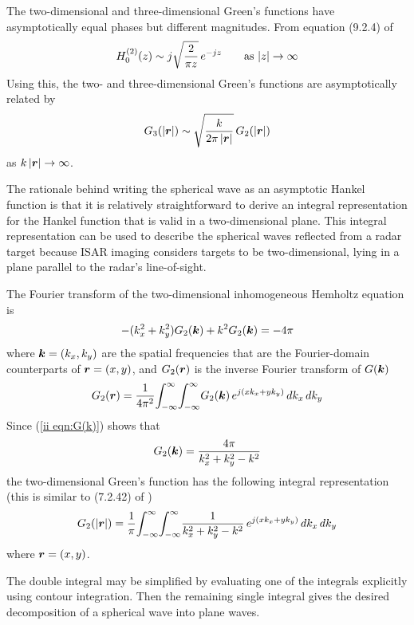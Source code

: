 The two-dimensional and three-dimensional Green's functions have
asymptotically equal phases but different magnitudes.  From equation (9.2.4)
of \cite{Abr65} 
\begin{equation}
H_0^{(2)}(z)\sim j\sqrt{\frac{2}{\pi z}}\,e^{-jz}
\qquad\hbox{as $\left|z\right|\to\infty$}
\end{equation}
Using this, the two- and three-dimensional Green's functions are
asymptotically related by
\begin{equation}\label{ii eqn:G2 and G3}
G_3(\left|\bm{r}\right|)\sim \sqrt{\frac{k}{2\pi\left|\bm{r}\right|}}
\,G_2(\left|\bm{r}\right|)
\end{equation}
as $k\left|\bm{r}\right|\to\infty$.  

The rationale behind writing the spherical wave as an asymptotic Hankel
function is that it is relatively straightforward to derive an integral
representation for the Hankel function that is valid in a two-dimensional
plane.  This integral representation can be used to describe the spherical
waves reflected from a radar target because ISAR imaging considers targets
to be two-dimensional, lying in a plane parallel to the radar's line-of-sight.

The Fourier transform of the two-dimensional inhomogeneous Hemholtz equation
is
\begin{equation}\label{ii eqn:G(k)}
-(k_x^2+k_y^2)G_2(\bm{k})+ k^2G_2(\bm{k})=-4\pi
\end{equation}
where $\bm{k}=(k_x,k_y)$ are the spatial frequencies that are the
Fourier-domain counterparts of $\bm{r}=(x,y)$, and $G_2(\bm{r})$ is the
inverse Fourier transform of $G(\bm{k})$
\begin{equation}
G_2(\bm{r})=\frac{1}{4\pi^2}{\int_{-\infty}^{\infty}}{\int_{-\infty}^{\infty}} G_2(\bm{k})\,
e^{j(xk_x +yk_y)}\,dk_x\,dk_y
\end{equation}
Since (\ref{ii eqn:G(k)}) shows that 
\begin{equation}
G_2(\bm{k})=\frac{4\pi}{k_x^2+k_y^2-k^2}
\end{equation}
the two-dimensional Green's function has the following integral 
representation (this is similar to (7.2.42) of \cite{Mor53a})
\begin{equation}
G_2(\left|\bm{r}\right|)
=\frac{1}{\pi}{\int_{-\infty}^{\infty}}{\int_{-\infty}^{\infty}} \frac{1}{k_x^2+k_y^2-k^2}\,
e^{j(xk_x+yk_y)}\,dk_x\,dk_y
\end{equation}
where $\bm{r}=(x,y)$.

The double integral may be simplified by evaluating one of the integrals 
explicitly using contour integration.  Then the remaining single integral
gives the desired decomposition of a spherical wave into plane waves.

